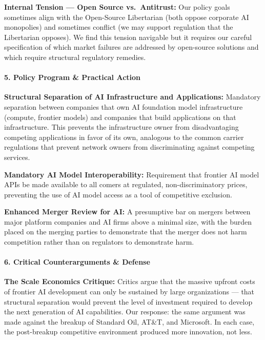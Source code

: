 \textbf{Internal Tension --- Open Source vs.~Antitrust:} Our policy
goals sometimes align with the Open-Source Libertarian (both oppose
corporate AI monopolies) and sometimes conflict (we may support
regulation that the Libertarian opposes). We find this tension navigable
but it requires our careful specification of which market failures are
addressed by open-source solutions and which require structural
regulatory remedies.

\paragraph{5. Policy Program \& Practical
Action}\label{policy-program-practical-action-28}

\textbf{Structural Separation of AI Infrastructure and Applications:}
Mandatory separation between companies that own AI foundation model
infrastructure (compute, frontier models) and companies that build
applications on that infrastructure. This prevents the infrastructure
owner from disadvantaging competing applications in favor of its own,
analogous to the common carrier regulations that prevent network owners
from discriminating against competing services.

\textbf{Mandatory AI Model Interoperability:} Requirement that frontier
AI model APIs be made available to all comers at regulated,
non-discriminatory prices, preventing the use of AI model access as a
tool of competitive exclusion.

\textbf{Enhanced Merger Review for AI:} A presumptive bar on mergers
between major platform companies and AI firms above a minimal size, with
the burden placed on the merging parties to demonstrate that the merger
does not harm competition rather than on regulators to demonstrate harm.

\paragraph{6. Critical Counterarguments \&
Defense}\label{critical-counterarguments-defense-28}

\textbf{The Scale Economics Critique:} Critics argue that the massive
upfront costs of frontier AI development can only be sustained by large
organizations --- that structural separation would prevent the level of
investment required to develop the next generation of AI capabilities.
Our response: the same argument was made against the breakup of Standard
Oil, AT\&T, and Microsoft. In each case, the post-breakup competitive
environment produced more innovation, not less.

